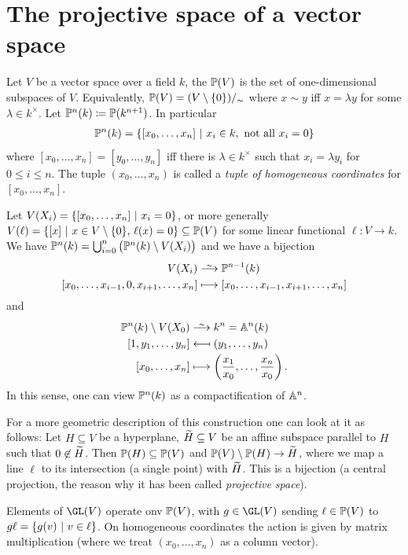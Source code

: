 \documentclass[a4paper,parskip=half,numbers=enddot, DIV=12]{scrreprt}
\begin{document}
\section{The projective space of a vector space}

\begin{defi}
    Let $V$ be a vector space over a field $k$, the  $\mathbb{P}(V)$ is the set of one-dimensional subspaces of $V$. Equivalently, $\mathbb{P}(V)=(V\setminus\{0\})/_\sim$ where $x\sim y$ iff $x=\lambda y$ for some $\lambda\in k^\times$. Let $\mathbb{P}^n(k) \coloneqq \mathbb{P}(k^{n+1})$. In particular
    \begin{align*}
        \mathbb{P}^n(k) = \left\{[x_0,\ldots, x_n]\ \middle|\  x_i\in k, \text{ not all } x_i=0\right\}
    \end{align*}
    where $[x_0,\ldots, x_n] = [y_0,\ldots,y_n]$ iff there is $\lambda\in k^\times$ such that $x_i=\lambda y_i$ for $0\leq i\leq n$. The tuple $(x_0,\ldots, x_n)$ is called a \emph{tuple of homogeneous coordinates} for $[x_0,\ldots,x_n]$. 
    
    Let $V(X_i) = \left\{[x_0,\ldots, x_n]\ \middle|\  x_i=0 \right\}$, or more generally $V(\ell) = \left\{ [x] \ \middle|\  x\in V\setminus\{0\}\text{, }\ell(x) = 0\right\}\subseteq \mathbb{P}(V)$ for some linear functional $\ell\colon V\to k$. We have $\mathbb{P}^n(k) = \bigcup_{i=0}^n \big(\mathbb{P}^n(k) \setminus V(X_i)\big)$ and we have a bijection
    \begin{align*}
        V(X_i) &\isomorphism \IP^{n-1} (k)\\
        [x_0,\ldots, x_{i-1},0,x_{i+1}, \ldots, x_n] &\longmapsto [x_0,\ldots, x_{i-1},x_{i+1}, \ldots, x_n]
    \end{align*}
    and 
    \begin{align*}
        \IP^n(k)\setminus V(X_0) &\isomorphism k^n = \IA^n(k)\\
        [1,y_1,\ldots, y_n] &\longmapsfrom (y_1,\ldots, y_n)\\
        [x_0,\ldots, x_n] &\longmapsto \left(\frac{x_1}{x_0}, \ldots, \frac{x_n}{x_0}\right).
    \end{align*}
    In this sense, one can view $\mathbb{P}^n(k)$ as a compactification of $\mathbb{A}^n$. 
    
    For a more geometric description of this construction one can look at it as follows: Let $H\subseteq V$ be a hyperplane, $\snake H\subseteq V$ be an affine subspace parallel to $H$ such that $0\not\in \snake H$. Then $\mathbb{P}(H) \subseteq \mathbb{P}(V)$ and $\IP(V)\setminus \IP(H) \to \snake H$, where we map a line $\ell$ to its intersection (a single point) with $\snake H$. This is a bijection (a central projection, the reason why it has been called \emph{projective space}).
    
    Elements of $\GL(V)$ operate onv $\mathbb{P}(V)$, with $g\in \GL(V)$ sending $\ell\in \mathbb{P}(V)$ to $g\ell = \left\{g(v)\ \middle|\  v\in \ell\right\}$. On homogeneous coordinates the action is given by matrix multiplication (where we treat $(x_0,\ldots,x_n)$ as a column vector). 
\end{defi}
\end{document}
